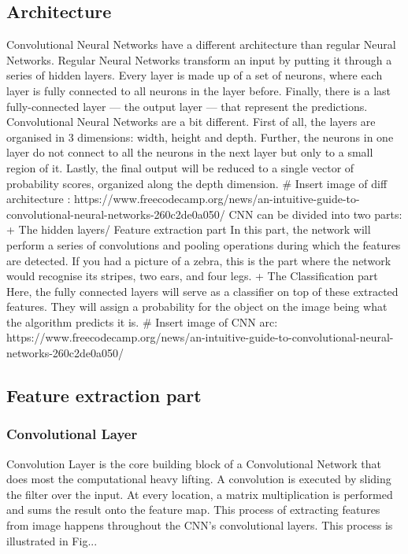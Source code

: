     \subsection{ Architecture }
      Convolutional Neural Networks have a different architecture than regular Neural Networks.
      Regular Neural Networks transform an input by putting it through a series of hidden layers. 
      Every layer is made up of a set of neurons, where each layer is fully connected to all neurons 
      in the layer before. Finally, there is a last fully-connected layer — the output layer — that 
      represent the predictions.
      Convolutional Neural Networks are a bit different. First of all, the layers are organised in 
      3 dimensions: width, height and depth. Further, the neurons in one layer do not connect to all 
      the neurons in the next layer but only to a small region of it. Lastly, the final output will 
      be reduced to a single vector of probability scores, organized along the depth dimension.
        # Insert image of diff architecture : https://www.freecodecamp.org/news/an-intuitive-guide-to-convolutional-neural-networks-260c2de0a050/
      CNN can be divided into two parts:
        + The hidden layers/ Feature extraction part
          In this part, the network will perform a series of convolutions and 
          pooling operations during which the features are detected. If you had a 
          picture of a zebra, this is the part where the network would recognise 
          its stripes, two ears, and four legs.
        + The Classification part
          Here, the fully connected layers will serve as a classifier on top of 
          these extracted features. They will assign a probability for the object 
          on the image being what the algorithm predicts it is.
        # Insert image of CNN arc: https://www.freecodecamp.org/news/an-intuitive-guide-to-convolutional-neural-networks-260c2de0a050/
    \subsection{ Feature extraction part }
      \subsubsection{ Convolutional Layer }
        Convolution Layer is the core building block of a Convolutional Network that does most
        the computational heavy lifting. A convolution is executed by sliding the filter over
        the input. At every location, a matrix multiplication is performed and sums the result onto 
        the feature map. This process of extracting features from image happens throughout the CNN's convolutional
        layers. This process is illustrated in Fig...

